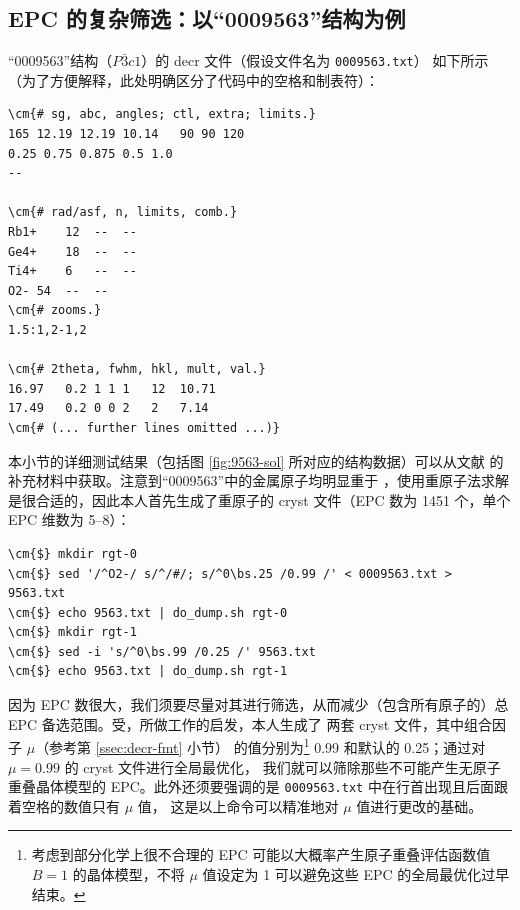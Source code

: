 \subsection{EPC 的复杂筛选：以“0009563”结构为例}\label{ssec:epc-filter}

“0009563”结构（$P\bar3c1$）的 decr 文件（假设文件名为 \verb|0009563.txt|）
如下所示（为了方便解释，此处明确区分了代码中的空格和制表符）：
\begin{Verbatim}[showtabs = true, showspaces = true]
\cm{# sg, abc, angles; ctl, extra; limits.}
165	12.19 12.19 10.14	90 90 120
0.25 0.75 0.875	0.5 1.0
--

\cm{# rad/asf, n, limits, comb.}
Rb1+	12	--	--
Ge4+	18	--	--
Ti4+	6	--	--
O2-	54	--	--
\cm{# zooms.}
1.5:1,2-1,2

\cm{# 2theta, fwhm, hkl, mult, val.}
16.97	0.2	1 1 1	12	10.71
17.49	0.2	0 0 2	2	7.14
\cm{# (... further lines omitted ...)}
\end{Verbatim}
本小节的详细测试结果（包括图 \ref{fig:9563-sol} 所对应的结构数据）可以从文献%
\parencite{liu2018}的补充材料中获取。注意到“0009563”中的金属原子均明显重于
，使用重原子法求解是很合适的，因此本人首先生成了重原子的
cryst 文件（EPC 数为 1451 个，单个 EPC 维数为 5--8）：
\begin{Verbatim}
\cm{$} mkdir rgt-0
\cm{$} sed '/^O2-/ s/^/#/; s/^0\bs.25 /0.99 /' < 0009563.txt > 9563.txt
\cm{$} echo 9563.txt | do_dump.sh rgt-0
\cm{$} mkdir rgt-1
\cm{$} sed -i 's/^0\bs.99 /0.25 /' 9563.txt
\cm{$} echo 9563.txt | do_dump.sh rgt-1
\end{Verbatim}
因为 EPC 数很大，我们须要尽量对其进行筛选，从而减少（包含所有原子的）总 EPC
备选范围。受\textcite{lu1965}，\textcite{reddy1965}所做工作的启发，本人生成了
两套 cryst 文件，其中组合因子 $\mu$（参考第 \ref{ssec:decr-fmt} 小节）
的值分别为\footnote{%
	考虑到部分化学上很不合理的 EPC 可能以大概率产生原子重叠评估函数值 $B = 1$
	的晶体模型，不将 $\mu$ 值设定为 1 可以避免这些 EPC 的全局最优化过早结束。%
} 0.99 和默认的 0.25；通过对 $\mu = 0.99$ 的 cryst 文件进行全局最优化，
我们就可以筛除那些不可能产生无原子重叠晶体模型的 EPC。此外还须要强调的是
\verb|0009563.txt| 中在行首出现且后面跟着空格的数值只有 $\mu$ 值，
这是以上命令可以精准地对 $\mu$ 值进行更改的基础。

